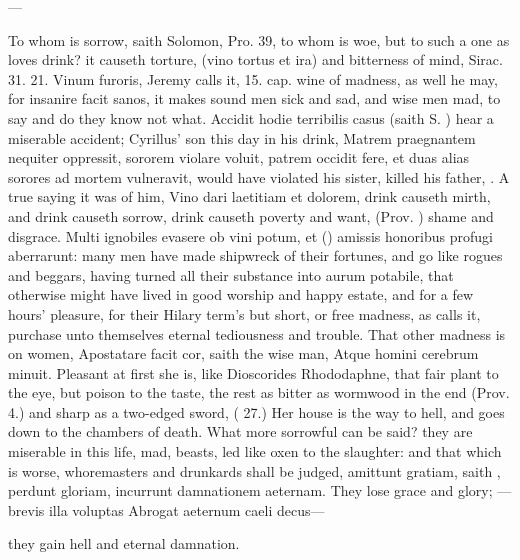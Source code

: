 {---

To whom is sorrow, saith Solomon, Pro.  39, to whom is woe, but
to such a one as loves drink? it causeth torture, (vino tortus et ira)
and bitterness of mind, Sirac. 31. 21. Vinum furoris, Jeremy calls it,
15. cap. wine of madness, as well he may, for insanire facit sanos, it
makes sound men sick and sad, and wise men mad, to say and do
they know not what. Accidit hodie terribilis casus (saith S.
\Austin{}) hear a miserable accident; Cyrillus' son this day in his drink,
Matrem praegnantem nequiter oppressit, sororem violare voluit, patrem
occidit fere, et duas alias sorores ad mortem vulneravit, would have
violated his sister, killed his father, \etc{}. A true saying it was of
him, Vino dari laetitiam et dolorem, drink causeth mirth, and drink
causeth sorrow, drink causeth poverty and want, (Prov. ) shame and
disgrace. Multi ignobiles evasere ob vini potum, et (\Austin{}) amissis
honoribus profugi aberrarunt: many men have made shipwreck of their
fortunes, and go like rogues and beggars, having turned all their
substance into aurum potabile, that otherwise might have lived in good
worship and happy estate, and for a few hours' pleasure, for their
Hilary term's but short, or free madness, as \Seneca calls it,
purchase unto themselves eternal tediousness and trouble.
That other madness is on women, Apostatare facit cor, saith the wise
man, Atque homini cerebrum minuit. Pleasant at first she is, like
Dioscorides Rhododaphne, that fair plant to the eye, but poison to the
taste, the rest as bitter as wormwood in the end (Prov.  4.) and
sharp as a two-edged sword, ( 27.) Her house is the way to hell,
and goes down to the chambers of death. What more sorrowful can be
said? they are miserable in this life, mad, beasts, led like oxen
to the slaughter: and that which is worse, whoremasters and drunkards
shall be judged, amittunt gratiam, saith \Austin{}, perdunt gloriam,
incurrunt damnationem aeternam. They lose grace and glory;
---brevis illa voluptas
Abrogat aeternum caeli decus---

they gain hell and eternal damnation.

}
